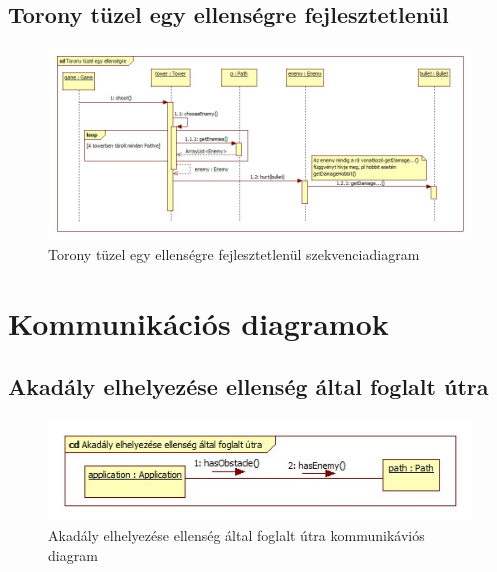 \subsection{Torony tüzel egy ellenségre fejlesztetlenül}
\begin{figure}[H]
\begin{center}
\includegraphics[width=17cm]{chapters/chapter05/images/sd_Torony_tuzel_egy_ellensegre_fejlesztetlenul.jpg}
\caption{Torony tüzel egy ellenségre fejlesztetlenül szekvenciadiagram}
\label{fig:sd_Torony_tuzel_egy_ellensegre_fejlesztetlenul}
\end{center}
\end{figure}



\section{Kommunikációs diagramok}

\subsection{Akadály elhelyezése ellenség által foglalt útra}
\begin{figure}[H]
\begin{center}
\includegraphics[width=17cm]{chapters/chapter05/images/cd_Akadaly_elhelyezese_ellenseg_altal_foglalt_utra.jpg}
\caption{Akadály elhelyezése ellenség által foglalt útra kommunikáviós diagram}
\label{fig:cd_Akadaly_elhelyezese_ellenseg_altal_foglalt_utra}
\end{center}
\end{figure}

